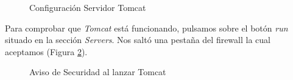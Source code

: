 \documentclass{scrartcl}
\begin{document}
\begin{figure}[H]
	
	\centering
	\caption{Configuración Servidor Tomcat}
	\label{fig:ConfEcl05}
	
\end{figure}
Para comprobar que \textit{Tomcat} está funcionando, pulsamos sobre el botón \textit{run} situado en la sección \textit{Servers}. Nos saltó una pestaña del firewall la cual aceptamos (Figura \ref{fig:ConfEcl06}).

\begin{figure}[H]
	
	\centering
	\caption{Aviso de Securidad al lanzar Tomcat}
	\label{fig:ConfEcl06}
	
\end{figure}
\end{document}

